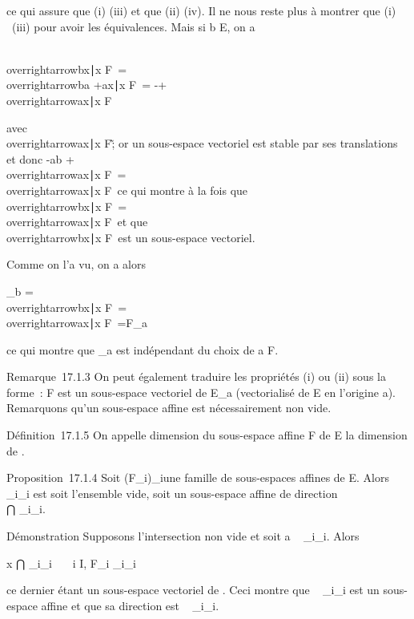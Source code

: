 \documentclass[]{article}
\begin{document}
ce qui assure que (i) \Leftrightarrow(iii) et que (ii) \Leftrightarrow(iv). Il ne nous reste plus à
montrer que (i) \rigtharrow~(iii) pour avoir les équivalences. Mais si b \in E, on a

\\overrightarrowbx∣x
\in F\ =
\\overrightarrowba
+\overrightarrow ax∣x \in
F\ = -\overrightarrowab +
\\overrightarrowax∣x
\in F\

avec \overrightarrowab
\in\\overrightarrowax∣x
\in F\~; or un sous-espace vectoriel est stable par ses
translations et donc -\overrightarrow ab +
\\overrightarrowax∣x
\in F\ =
\\overrightarrowax∣x
\in F\ ce qui montre à la fois que
\\overrightarrowbx∣x
\in F\ =
\\overrightarrowax∣x
\in F\ et que
\\overrightarrowbx∣x
\in F\ est un sous-espace vectoriel.

Comme on l'a vu, on a alors

\overrightarrowF_b =
\\overrightarrowbx∣x
\in F\ =
\\overrightarrowax∣x
\in F\ =\overrightarrow F_a

ce qui montre que \overrightarrowF_a est
indépendant du choix de a \in F.

Remarque~17.1.3 On peut également traduire les propriétés (i) ou (ii)
sous la forme~: F est un sous-espace vectoriel de E_a
(vectorialisé de E en l'origine a). Remarquons qu'un sous-espace affine
est nécessairement non vide.

Définition~17.1.5 On appelle dimension du sous-espace affine F de E la
dimension de \overrightarrowF.

Proposition~17.1.4 Soit (F_i)_i\inI une famille de
sous-espaces affines de E. Alors
\⋂ ~
_i\inIF_i est soit l'ensemble vide, soit un sous-espace
affine de direction \\⋂
 _i\inI\overrightarrowF_i.

Démonstration Supposons l'intersection non vide et soit a
\in\⋂ ~
_i\inIF_i. Alors

x \in⋂ _i\inIF_i~
\Leftrightarrow \forall~~i \in I,
\overrightarrowax \in\overrightarrow
F_i \Leftrightarrow
\overrightarrowax \in\⋂
_i\inI\overrightarrowF_i

ce dernier étant un sous-espace vectoriel de
\overrightarrowE. Ceci montre que
\⋂ ~
_i\inIF_i est un sous-espace affine et que sa direction
est \⋂ ~
_i\inI\overrightarrowF_i.
\end{document}
